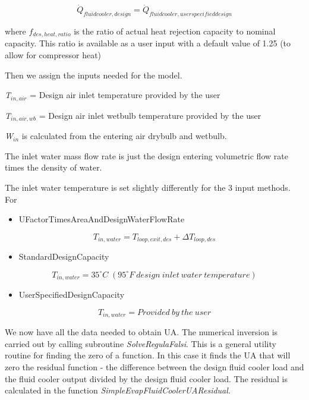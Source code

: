 \begin{equation}
{\dot Q_{fluidcooler,design}} = {\dot Q_{fluidcooler,userspecifieddesign}}
\end{equation}

where \({f_{des,heat,ratio}}\) is the ratio of actual heat rejection capacity to nominal capacity. This ratio is available as a user input with a default value of 1.25 (to allow for compressor heat)

Then we assign the inputs needed for the model.

\emph{T\(_{in,air}\)} = Design air inlet temperature provided by the user

\emph{T\(_{in,air,wb}\)} = Design air inlet wetbulb temperature provided by the user

\emph{W\(_{in}\)} is calculated from the entering air drybulb and wetbulb.

The inlet water mass flow rate is just the design entering volumetric flow rate times the density of water.

The inlet water temperature is set slightly differently for the 3 input methods. For

\begin{itemize}
\tightlist
\item
  UFactorTimesAreaAndDesignWaterFlowRate
\end{itemize}

\begin{equation}
{T_{in,water}} = {T_{loop,exit,des}} + \Delta {T_{loop,des}}
\end{equation}

\begin{itemize}
\tightlist
\item
  StandardDesignCapacity
\end{itemize}

\begin{equation}
{T_{in,water}} = 35^\circ C\;(95^\circ F~design~inlet~water~temperature)
\end{equation}

\begin{itemize}
\tightlist
\item
  UserSpecifiedDesignCapacity
\end{itemize}

\begin{equation}
{T_{in,water}} = Provided~by~the~user
\end{equation}

We now have all the data needed to obtain UA. The numerical inversion is carried out by calling subroutine \emph{SolveRegulaFalsi}. This is a general utility routine for finding the zero of a function. In this case it finds the UA that will zero the residual function - the difference between the design fluid cooler load and the fluid cooler output divided by the design fluid cooler load. The residual is calculated in the function \emph{SimpleEvapFluidCoolerUAResidual.}

